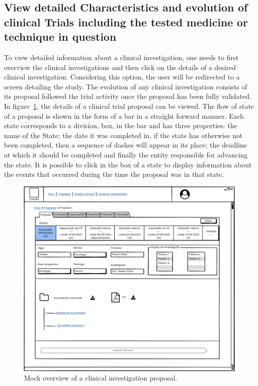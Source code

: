 \subsection{View detailed Characteristics and evolution of clinical Trials including the tested medicine or technique in question}
\label{subsec:clinical-investigation-details}
To view detailed information about a clinical investigation, one needs to first overview the clinical investigations and then click on the details of a desired clinical investigation. Considering this option, the user will be redirected to a screen detailing the study.  
The evolution of any clinical investigation consists of its proposal followed the trial activity once the proposal has been fully validated.
In figure~\ref{fig:proposta-detalhe}, the details of a clinical trial proposal can be viewed. The flow of state of a proposal is shown in the form of a bar in a straight forward manner. Each state corresponds to a division, box, in the bar and has three properties: the name of the State; the date it was completed in, if the state has otherwise not been completed, then a sequence of dashes will appear in its place; the deadline at which it should be completed and finally the entity responsible for advancing the state.  
It is possible to click in the box of a state to display information about the events that occurred during the time the proposal was in that state. 

\begin{figure}[H]
    \centering
    \includegraphics[scale=0.35]{Chapters/img/propostas/proposta-detalhe.png}
    \caption{Mock overview of a clinical investigation proposal.}
    \label{fig:proposta-detalhe}
\end{figure}

